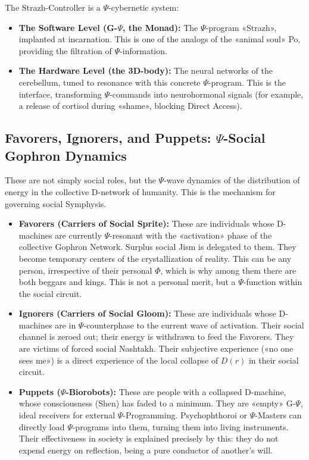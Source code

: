 \documentclass[a4paper,12pt]{article}
\begin{document}
	The Strazh-Controller is a $\Psi$-cybernetic system:
	
	\begin{itemize}
		\item \textbf{The Software Level (G-$\Psi$, the Monad):} The $\Psi$-program «Strazh», implanted at incarnation. This is one of the analogs of the «animal soul» Po, providing the filtration of $\Psi$-information.
		\item \textbf{The Hardware Level (the 3D-body):} The neural networks of the cerebellum, tuned to resonance with this concrete $\Psi$-program. This is the interface, transforming $\Psi$-commands into neurohormonal signals (for example, a release of cortisol during «shame», blocking Direct Access).
	\end{itemize}
	
	\subsection{Favorers, Ignorers, and Puppets: $\Psi$-Social Gophron Dynamics}
	
	These are not simply social roles, but the $\Psi$-wave dynamics of the distribution of energy in the collective D-network of humanity. This is the mechanism for governing social Symphysis.
	
	\begin{itemize}
		\item \textbf{Favorers (Carriers of Social Sprite):} These are individuals whose D-machines are currently $\Psi$-resonant with the «activation» phase of the collective Gophron Network. Surplus social Jism is delegated to them. They become temporary centers of the crystallization of reality. This can be any person, irrespective of their personal $\Phi$, which is why among them there are both beggars and kings. This is not a personal merit, but a $\Psi$-function within the social circuit.
		
		\item \textbf{Ignorers (Carriers of Social Gloom):} These are individuals whose D-machines are in $\Psi$-counterphase to the current wave of activation. Their social channel is zeroed out; their energy is withdrawn to feed the Favorers. They are victims of forced social Nashtakh. Their subjective experience («no one sees me») is a direct experience of the local collapse of $D(r)$ in their social circuit.
		
		\item \textbf{Puppets ($\Psi$-Biorobots):} These are people with a collapsed D-machine, whose consciousness (Shen) has faded to a minimum. They are «empty» G-$\Psi$, ideal receivers for external $\Psi$-Programming. Psychophthoroi or $\Psi$-Masters can directly load $\Psi$-programs into them, turning them into living instruments. Their effectiveness in society is explained precisely by this: they do not expend energy on reflection, being a pure conductor of another's will.
	\end{itemize}
	
\end{document}
